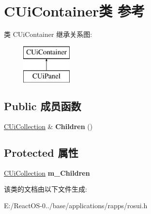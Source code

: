 \hypertarget{class_c_ui_container}{}\section{C\+Ui\+Container类 参考}
\label{class_c_ui_container}
类 C\+Ui\+Container 继承关系图\+:\begin{figure}[H]
\begin{center}
\leavevmode
\includegraphics[height=2.000000cm]{class_c_ui_container}
\end{center}
\end{figure}
\subsection*{Public 成员函数}
\begin{DoxyCompactItemize}
\item 
\mbox{\label{class_c_ui_container_ab9567667b47bcb3fcb9aac36dafc3ce3}} 
\hyperlink{class_c_ui_collection}{C\+Ui\+Collection} \& {\bfseries Children} ()
\end{DoxyCompactItemize}
\subsection*{Protected 属性}
\begin{DoxyCompactItemize}
\item 
\mbox{\label{class_c_ui_container_a84da4e692090046ccd0ecfe777e03655}} 
\hyperlink{class_c_ui_collection}{C\+Ui\+Collection} {\bfseries m\+\_\+\+Children}
\end{DoxyCompactItemize}


该类的文档由以下文件生成\+:\begin{DoxyCompactItemize}
\item 
E\+:/\+React\+O\+S-\/0../base/applications/rapps/rosui.\+h\end{DoxyCompactItemize}
